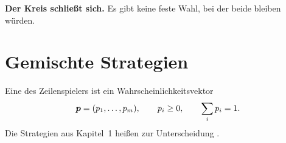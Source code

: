\begin{merksatz}
\begin{center}
\begin{minipage}{0.9\textwidth}
\textbf{Der Kreis schließt sich.} Es gibt keine feste Wahl, bei der beide bleiben würden.
\end{minipage}
\end{center}

\begin{center}
\begin{minipage}{0.88\textwidth}
\end{minipage}
\end{center}
\end{merksatz}

\section{Gemischte Strategien}

\begin{definition}
Eine  des Zeilenspielers ist ein Wahrscheinlichkeitsvektor
\[ \boldsymbol{p} = (p_1,\ldots,p_m), \qquad p_i \ge 0, \qquad \sum_i p_i = 1 . \]
Die Strategien aus Kapitel~1 heißen zur Unterscheidung .
\end{definition}

